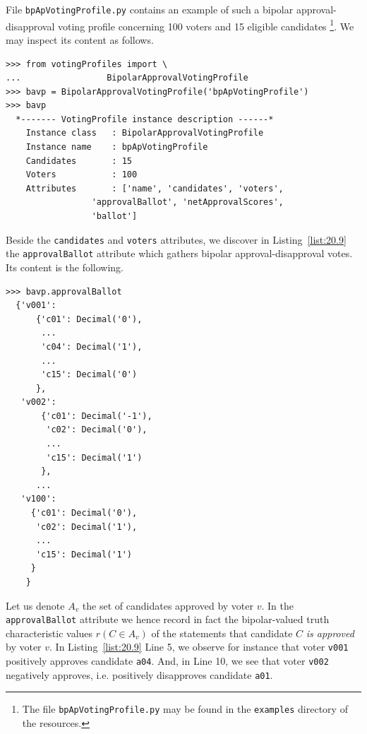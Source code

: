 File \texttt{bpApVotingProfile.py} contains an example of such a bipolar approval-disapproval voting profile concerning 100 voters and 15 eligible candidates \footnote{The file \texttt{bpApVotingProfile.py} may be found in the \texttt{examples} directory of the \Digraph resources.}. We may inspect its content as follows.
\begin{lstlisting}[caption={Bipolar approval vonting profiles},label=list:20.9]
>>> from votingProfiles import \
...                 BipolarApprovalVotingProfile
>>> bavp = BipolarApprovalVotingProfile('bpApVotingProfile')
>>> bavp
  *------- VotingProfile instance description ------*
    Instance class   : BipolarApprovalVotingProfile
    Instance name    : bpApVotingProfile
    Candidates       : 15
    Voters           : 100
    Attributes       : ['name', 'candidates', 'voters',
                 'approvalBallot', 'netApprovalScores',
                 'ballot']
\end{lstlisting}

Beside the \texttt{candidates} and \texttt{voters} attributes, we discover in Listing~\vref{list:20.9} the \texttt{approvalBallot} attribute which gathers bipolar approval-disapproval votes. Its content is the following.
\begin{lstlisting}[caption={Inspecting a bipolar approval-disapproval ballot},label=list:20.9]
>>> bavp.approvalBallot
  {'v001':
      {'c01': Decimal('0'),
       ...
       'c04': Decimal('1'),
       ...
       'c15': Decimal('0')
      },
   'v002':
       {'c01': Decimal('-1'),
        'c02': Decimal('0'),
        ...
        'c15': Decimal('1')
       },
      ...
   'v100':
     {'c01': Decimal('0'),
      'c02': Decimal('1'),
      ...
      'c15': Decimal('1')
     }
    }
\end{lstlisting}	

Let us denote $A_v$ the set of candidates approved by voter $v$. In the \texttt{approvalBallot} attribute we hence record in fact the bipolar-valued truth characteristic values $r(C \in A_v)$ of the statements that candidate $C$ \emph{is approved} by voter $v$. In Listing~\vref{list:20.9} Line 5, we observe for instance that voter \texttt{v001} positively approves candidate \texttt{a04}. And, in Line 10, we see that voter \texttt{v002} negatively approves, i.e. positively disapproves candidate \texttt{a01}.

